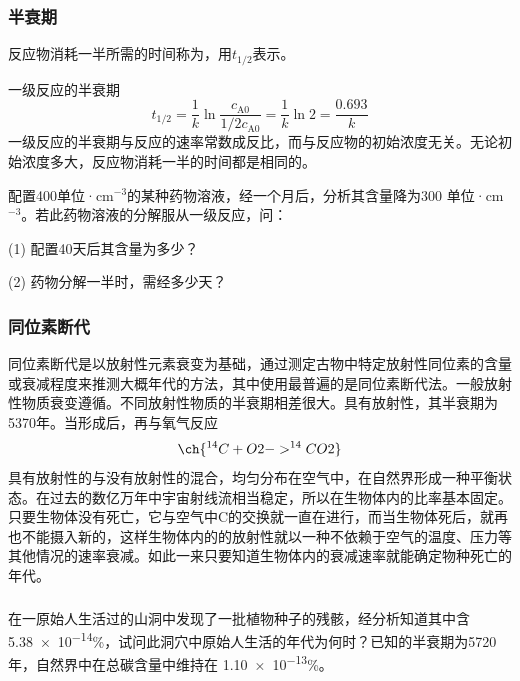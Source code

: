\documentclass[dvipsnames, svgnames, x11names]{beamer}
\begin{document}
    \begin{frame}
        \frametitle{半衰期}
        反应物消耗一半所需的时间称为，用$t_{1/2}$表示。

        一级反应的半衰期
        \[
            t_{1/2} = \frac{1}{k} \ln \frac{c_\mathrm{A0}}{1/2 c_\mathrm{A0}} = \frac{1}{k} \ln 2 = \frac{0.693}{k}
        \]
        一级反应的半衰期与反应的速率常数成反比，而与反应物的初始浓度无关。无论初始浓度多大，反应物消耗一半的时间都是相同的。
        \begin{example}
            配置400单位·cm$^{-3}$的某种药物溶液，经一个月后，分析其含量降为300 单位·cm$^{-3}$。若此药物溶液的分解服从一级反应，问：
            
            (1) 配置40天后其含量为多少？

            (2) 药物分解一半时，需经多少天？
        \end{example}
    \end{frame}

    
    
    \begin{frame}
        \frametitle{同位素断代}
    
        同位素断代是以放射性元素衰变为基础，通过测定古物中特定放射性同位素的含量或衰减程度来推测大概年代的方法，其中使用最普遍的是同位素断代法。一般放射性物质衰变遵循。不同放射性物质的半衰期相差很大。具有放射性，其半衰期为5370年。当形成后，再与氧气反应
        \[
            \ch{^{14}C + O2 -> ^{14}CO2}
        \]
        具有放射性的与没有放射性的混合，均匀分布在空气中，在自然界形成一种平衡状态。在过去的数亿万年中宇宙射线流相当稳定，所以在生物体内的比率基本固定。只要生物体没有死亡，它与空气中C的交换就一直在进行，而当生物体死后，就再也不能摄入新的，这样生物体内的的放射性就以一种不依赖于空气的温度、压力等其他情况的速率衰减。如此一来只要知道生物体内的衰减速率就能确定物种死亡的年代。
    
    \end{frame}
    

    \begin{frame}[t]
        \frametitle{}
        \begin{example}
            在一原始人生活过的山洞中发现了一批植物种子的残骸，经分析知道其中含 \num{5.38e-14}\%，试问此洞穴中原始人生活的年代为何时？已知的半衰期为5720年，自然界中在总碳含量中维持在 \num{1.10e-13}\%。
        \end{example}
    \end{frame}
    
\end{document}
